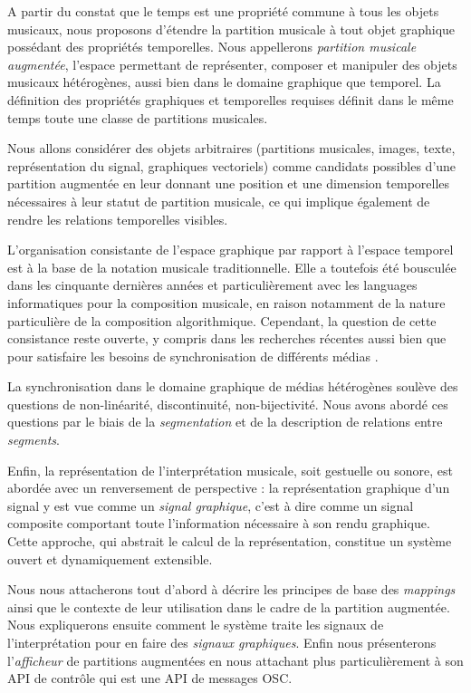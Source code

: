 \documentclass{article}
\begin{document}
A partir du constat que le temps est une propriété commune à tous les objets musicaux, nous proposons d'étendre la partition musicale à tout objet graphique possédant des propriétés temporelles. Nous appellerons \emph{partition musicale augmentée}, l'espace permettant de représenter, composer et manipuler des objets musicaux hétérogènes, aussi bien dans le domaine graphique que temporel. La définition des propriétés graphiques et temporelles requises définit dans le même temps toute une classe de partitions musicales.

Nous allons considérer des objets arbitraires (partitions musicales, images, texte, représentation du signal, graphiques vectoriels) comme candidats possibles d'une partition augmentée en leur donnant une position et une dimension temporelles nécessaires à leur statut de partition musicale, ce qui implique également de rendre les relations temporelles visibles. 

L'organisation consistante de l'espace graphique par rapport à l'espace temporel est à la base de la notation musicale traditionnelle. Elle a toutefois été bousculée dans les cinquante dernières années \cite{boucou} et particulièrement avec les languages informatiques pour la composition musicale, en raison notamment de la nature particulière de la composition algorithmique. Cependant, la question de cette consistance reste ouverte, y compris dans les recherches récentes \cite{bresson08} aussi bien que pour satisfaire les besoins de synchronisation de différents médias \cite{baggi09b,ludo06}.

La synchronisation dans le domaine graphique de médias hétérogènes soulève des questions de non-linéarité, discontinuité, non-bijectivité. Nous avons abordé ces questions par le biais de la \emph{segmentation} et de la description de relations entre \emph{segments}. 

Enfin, la représentation de l'interprétation musicale, soit gestuelle ou sonore, est abordée avec un renversement de perspective : la représentation graphique d'un signal y est vue comme un \emph{signal graphique}, c'est à dire comme un signal composite comportant toute l'information nécessaire à son rendu graphique. Cette approche, qui abstrait le calcul de la représentation, constitue un système ouvert et dynamiquement extensible.

Nous nous attacherons tout d'abord à décrire les principes de base des \emph{mappings} ainsi que le contexte de leur utilisation dans le cadre de la partition augmentée. Nous expliquerons ensuite comment le système traite les signaux de l'interprétation pour en faire des \emph{signaux graphiques}. Enfin nous présenterons l'\emph{afficheur} de partitions augmentées en nous attachant plus particulièrement à son API de contrôle qui est une API de messages OSC\cite{wright02}.
\end{document}

